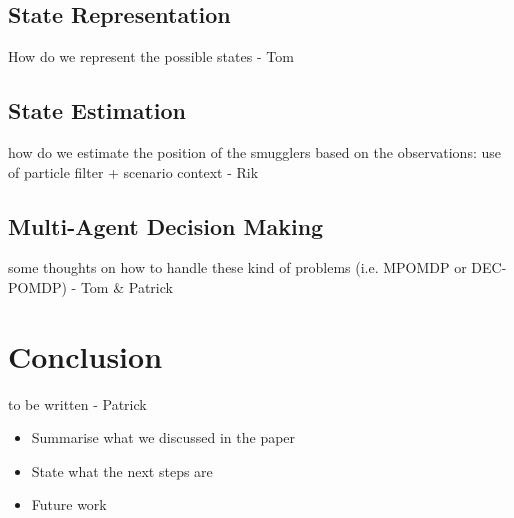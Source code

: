 \documentclass[conference]{IEEEtran}
\begin{document}
\subsection{State Representation}

{\red How do we represent the possible states - Tom}

\subsection{State Estimation}

{\red how do we estimate the position of the smugglers based on the observations: use of particle filter + scenario context - Rik}

\subsection{Multi-Agent Decision Making}

{\red some thoughts on how to handle these kind of problems (i.e. MPOMDP or DEC-POMDP) - Tom \& Patrick}

\section{Conclusion}

{\red to be written - Patrick}

\begin{itemize}
\item Summarise what we discussed in the paper
\item State what the next steps are
\item Future work
\end{itemize}





\end{document}
